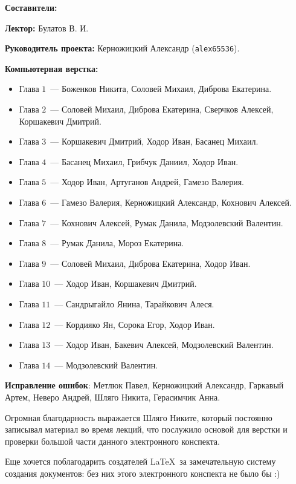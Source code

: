 \documentclass[../main.tex]{subfiles}
\begin{document}
 

{\Huge \bf Составители:}

\vspace{2em}

{
    \textbf{Лектор:} Булатов В. И.
    
    \smallskip
    
    \textbf{Руководитель проекта:} Керножицкий Александр 
    (\texttt{alex65536}).
    
    \smallskip
    
    \textbf{Компьютерная верстка:}
    \begin{itemize}
     \item Глава $1$~--- Боженков Никита, Соловей Михаил, Диброва Екатерина.
     \item Глава $2$~--- Соловей Михаил, Диброва Екатерина, Сверчков Алексей,
     Коршакевич Дмитрий.
     \item Глава $3$~--- Коршакевич Дмитрий, Ходор Иван, Басанец Михаил.
     \item Глава $4$~--- Басанец Михаил, Грибчук Даниил, Ходор Иван.
     \item Глава $5$~--- Ходор Иван, Артуганов Андрей, Гамезо Валерия.
     \item Глава $6$~--- Гамезо Валерия, Керножицкий Александр,
     Кохнович Алексей.
     \item Глава $7$~--- Кохнович Алексей, Румак Данила, Модзолевский Валентин.
     \item Глава $8$~--- Румак Данила, Мороз Екатерина.
     \item Глава $9$~--- Соловей Михаил, Диброва Екатерина, Ходор Иван.
     \item Глава $10$~--- Ходор Иван, Коршакевич Дмитрий.
     \item Глава $11$~--- Сандрыгайло Янина, Тарайкович Алеся.
     \item Глава $12$~--- Кордияко Ян, Сорока Егор, Ходор Иван.
     \item Глава $13$~--- Ходор Иван, Бакевич Алексей, Модзолевский Валентин.
     \item Глава $14$~--- Модзолевский Валентин.
    \end{itemize}
    
    \textbf{Исправление ошибок}: Метлюк Павел, Керножицкий Александр, Гаркавый
    Артем, Неверо Андрей, Шляго Никита, Герасимчик Анна.
    
    \smallskip
    
    Огромная благодарность выражается Шляго Никите, который постоянно записывал
    материал во время лекций, что послужило основой для верстки и проверки
    большой части данного электронного конспекта.
    
    
    \smallskip
    
    Еще хочется поблагодарить создателей \LaTeX\ за замечательную 
    систему создания документов: без них этого электронного 
    конспекта не было бы :)
}

\pagebreak
\end{document}
